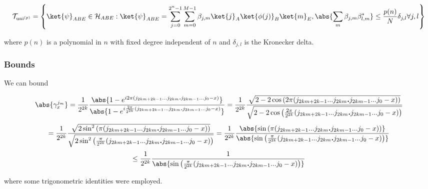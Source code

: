 \begin{equation}
    \mathcal{T}_{\text{uni}^{(p)}} = \left\{\ket{\psi}_{ABE} \in \mathcal{H}_{ABE} : \ket{\psi}_{ABE} = \sum_{j=0}^{2^n -1}\sum_{m=0}^{M-1}\beta_{j,m}\ket{j}_A\ket{\phi(j)}_B\ket{m}_E, \abs{\sum_{m}\beta_{j,m}\beta^{*}_{l,m}} \leq \frac{p(n)}{N}\delta_{j,l} \forall j,l\right\}
    \label{eq_t_uni}
\end{equation}

where $p(n)$ is a polynomial in $n$ with fixed degree independent of $n$ and $\delta_{j,l}$ is the Kronecker delta.

\subsubsection{Bounds}


We can bound 

\begin{equation*}
    \abs{\gamma_{x}^{j_m}} = \frac{1}{2^{2k}}\frac{\abs{1 - e^{i2\pi(j_{2km+2k-1}...j_{2km}\textbf{.}j_{2km-1}...j_0-x)}}}{\abs{1 - e^{i\frac{2\pi}{2^{2k}}(j_{2km+2k-1}...j_{2km}\textbf{.}j_{2km-1}...j_0-x)}}} = \frac{1}{2^{2k}}\frac{\sqrt{2-2\cos\left(2\pi(j_{2km+2k-1}...j_{2km}\textbf{.}j_{2km-1}...j_0-x)\right)}}{\sqrt{2-2\cos\left(\frac{2\pi}{2^{2k}}(j_{2km+2k-1}...j_{2km}\textbf{.}j_{2km-1}...j_0-x)\right)}}
\end{equation*}
\begin{equation*}
    = \frac{1}{2^{2k}}\frac{\sqrt{2\sin^2\left(\pi(j_{2km+2k-1}...j_{2km}\textbf{.}j_{2km-1}...j_0-x)\right)}}{\sqrt{2\sin^2\left(\frac{\pi}{2^{2k}}(j_{2km+2k-1}...j_{2km}\textbf{.}j_{2km-1}...j_0-x)\right)}} = \frac{1}{2^{2k}}\frac{\abs{\sin\left(\pi(j_{2km+2k-1}...j_{2km}\textbf{.}j_{2km-1}...j_0-x)\right)}}{\abs{\sin\left(\frac{\pi}{2^{2k}}(j_{2km+2k-1}...j_{2km}\textbf{.}j_{2km-1}...j_0-x)\right)}}
\end{equation*}
\begin{equation*}
    \leq \frac{1}{2^{2k}}\frac{1}{\abs{\sin\left(\frac{\pi}{2^{2k}}(j_{2km+2k-1}...j_{2km}\textbf{.}j_{2km-1}...j_0-x)\right)}}
\end{equation*}

where some trigonometric identities were employed.